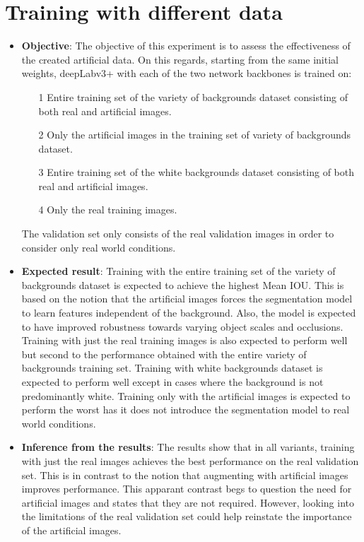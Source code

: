 \section{Training with different data}

	\begin{itemize}
		\item \textbf{Objective}: The objective of this experiment is to assess the effectiveness of the created artificial data. On this regards, starting from the same initial weights, deepLabv3+ with each of the two network backbones is trained on:
		\begin{itemize}
			\item[1] Entire training set of the variety of backgrounds dataset consisting of both real and artificial images.
			\item[2] Only the artificial images in the training set of variety of backgrounds dataset.
			\item[3] Entire training set of the white backgrounds dataset consisting of both real and artificial images.
			\item[4] Only the real training images.
		\end{itemize}
	The validation set only consists of the real validation images in order to consider only real world conditions.
		\item \textbf{Expected result}: Training with the entire training set of the variety of backgrounds dataset is expected to achieve the highest Mean IOU. This is based on the notion that the artificial images forces the segmentation model to learn features independent of the background. Also, the model is expected to have improved robustness towards varying object scales and occlusions. Training with just the real training images is also expected to perform well but second to the performance obtained with the entire variety of backgrounds training set. Training with white backgrounds dataset is expected to perform well except in cases where the background is not predominantly white. Training only with the artificial images is expected to perform the worst has it does not introduce the segmentation model to real world conditions.
		\item \textbf{Inference from the results}: The results show that in all variants, training with just the real images achieves the best performance on the real validation set. This is in contrast to the notion that augmenting with artificial images improves performance. This apparant contrast begs to question the need for artificial images and states that they are not required. However, looking into the limitations of the real validation set could help reinstate the importance of the artificial images.

\end{itemize}
